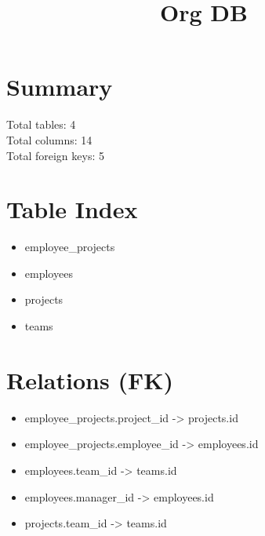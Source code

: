 \documentclass[11pt]{article}
\title{Org DB}
\begin{document}
\maketitle
\section*{Summary}
Total tables: 4\\
Total columns: 14\\
Total foreign keys: 5

\section*{Table Index}
\begin{itemize}
  \item employee\_projects
  \item employees
  \item projects
  \item teams
\end{itemize}

\section*{Relations (FK)}
\begin{itemize}
  \item employee\_projects.project\_id -> projects.id
  \item employee\_projects.employee\_id -> employees.id
  \item employees.team\_id -> teams.id
  \item employees.manager\_id -> employees.id
  \item projects.team\_id -> teams.id
\end{itemize}
\end{document}
